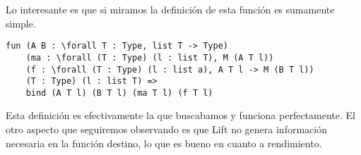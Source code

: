 Lo interesante es que si miramos la definición de esta función es sumamente simple.

\begin{lstlisting}
fun (A B : \forall T : Type, list T -> Type)
    (ma : \forall (T : Type) (l : list T), M (A T l))
    (f : \forall (T : Type) (l : list a), A T l -> M (B T l))
    (T : Type) (l : list T) =>
    bind (A T l) (B T l) (ma T l) (f T l)
\end{lstlisting}

Esta definición es efectivamente la que buscabamos y funciona perfectamente. El otro aspecto que seguiremos observando
es que Lift no genera información necesaria en la función destino, lo que es bueno en cuanto a rendimiento.
